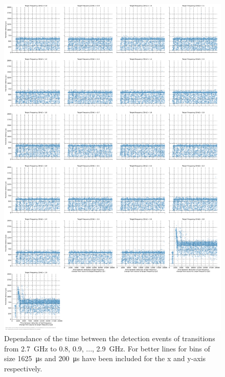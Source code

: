 \begin{figure}[]
    \centering
    \includegraphics[width=\columnwidth]{fig/ftalat/ftalat_scatter_wait_transition_latency_hati_source_2.7.pdf}
    \caption{Dependance of the time between the detection events of transitions from \SI{2.7}{\GHz} to \SI{0.8}{}, \SI{0.9}{}, ..., \SI{2.9}{\GHz}. For better lines for bins of size \SI{1625}{\us} and \SI{200}{\us} have been included for the x and y-axis respectively.}
\end{figure}
